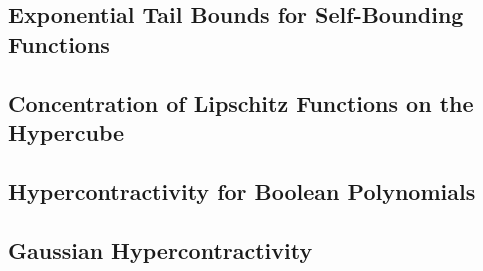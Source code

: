 \documentclass[11pt]{article}
\begin{document}
\subsection{Exponential Tail Bounds for Self-Bounding Functions}

\subsection{Concentration of Lipschitz Functions on the Hypercube}
\subsection{Hypercontractivity for Boolean Polynomials}
\subsection{Gaussian Hypercontractivity}



\newpage


\end{document}
